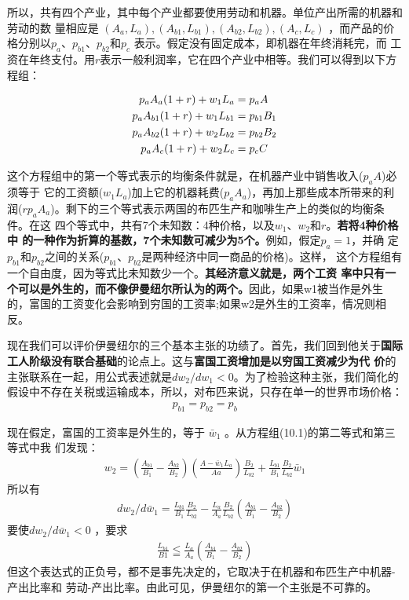 所以，共有四个产业，其中每个产业都要使用劳动和机器。单位产出所需的机器和劳动的数
量相应是 $(A_a, L_a), (A_{b1}, L_{b1}),(A_{b2}, L_{b2}),(A_c, L_c)$ ，而产品的价
格分别以$p_a、p_{b1}、p_{b2}和p_c$ 表示。假定没有固定成本，即机器在年终消耗完，而
工资在年终支付。用$r$表示一般利润率，它在四个产业中相等。我们可以得到以下方程组：

\begin{align}
p_aA_a   (1+r)+w_1L_a &= p_aA \notag \\
p_aA_{b1} (1+r)+w_1L_{b1} &= p_{b1}B_1  \notag \\
p_aA_{b2} (1+r)+w_2L_{b2} &= p_{b2}B_2 \notag \\
p_aA_c   (1+r)+w_2L_c &= p_cC
\end{align}

这个方程组中的第一个等式表示的均衡条件就是，在机器产业中销售收入($p_aA$)必须等于
它的工资额($w_1L_a$)加上它的机器耗费($p_aA_a$)，再加上那些成本所带来的利
润($rp_aA_a$)。剩下的三个等式表示两国的布匹生产和咖啡生产上的类似的均衡条件。在这
四个等式中，共有7个未知数：4种价格，以及$w_1$、$w_2$和$r$。\textbf{若将4种价格中
  的一种作为折算的基数，7个未知数可减少为5个。}例如，假定$p_a=1$，并确
定$p_{b1}$和$p_{b2}$之间的关系($p_{b1}、p_{b2}$是两种经济中同一商品的价格)。这样，
这个方程组有一个自由度，因为等式比未知数少一个。\textbf{其经济意义就是，两个工资
  率中只有一个可以是外生的，而不像伊曼纽尔所认为的两个。}因此，如果w1被当作是外生
的，富国的工资变化会影响到穷国的工资率;如果w2是外生的工资率，情况则相反。

现在我们可以评价伊曼纽尔的三个基本主张的功绩了。首先，我们回到他关于\textbf{国际
  工人阶级没有联合基础}的论点上。这与\textbf{富国工资增加是以穷国工资减少为代
  价}的主张联系在一起，用公式表述就是$dw_2 / dw_1<0$。为了检验这种主张，我们简化的
假设中不存在关税或运输成本，所以，对布匹来说，只存在单一的世界市场价格：
\begin{gather}
p_{b1}=p_{b2}=p_b
\end{gather}

现在假定，富国的工资率是外生的，等于 $\bar{w}_1$ 。从方程组(10.1)的第二等式和第三等式中我
们发现：
\begin{gather}
  w_2=\left(\frac{A_{b1}}{B_1} - \frac{A_{b2}}{B_2} \right)
  \left(\frac{A-\bar{w}_1L_a}{Aa} \right)\frac{B_2}{L_{b2}} +
  \frac{L_{b1}}{B_1}\frac{B_2}{L_{b2}}\bar{w}_1
\end{gather}
所以有
\begin{gather}
dw_2/d\bar{w}_1=\frac{L_{b1}}{B_1} \frac{B_2}{L_{b2}} - \frac{L_a}{A_a}
\frac{B_2}{L_{b2}} \left(\frac{A_{b1}}{B_1}-\frac{A_{b2}}{B_2} \right)
\end{gather}
要使$dw_2/d\bar{w}_1<0$ ，要求
\begin{gather}
\frac{L_{b1}}{B1} \leqq \frac{L_a}{A_a}\left(\frac{A_{b1}}{B_1} - \frac{A_{b2}}{B_2} \right)
\end{gather}
但这个表达式的正负号，都不是事先决定的，它取决于在机器和布匹生产中机器-产出比率和
劳动-产出比率。由此可见，伊曼纽尔的第一个主张是不可靠的。

